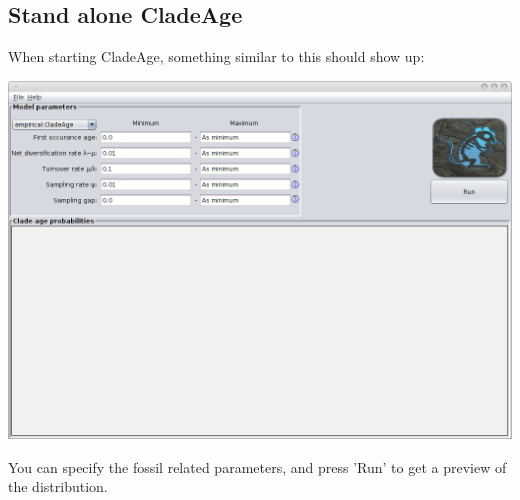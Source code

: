 \documentclass{article}
\begin{document}
\subsection{Stand alone CladeAge}
When starting CladeAge, something similar to this should show up:
\begin{center}\includegraphics[width=\textwidth,clip=true,trim=0 0 0 0]{ca.png}\end{center}
You can specify the fossil related parameters, and press 'Run' to get a preview
of the distribution.

\end{document}
